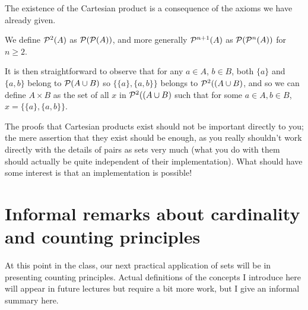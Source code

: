 \documentclass[12pt]{article}
\begin{document}
\begin{description}
The existence of the Cartesian product is a consequence of the axioms we have already given.

We define ${\cal P}^2(A)$ as ${\cal P}({\cal P}(A))$, and more generally ${\cal P}^{n+1}(A)$ as 
${\cal P}({\cal P}^n(A))$ for $n \geq 2$.

It is then straightforward to observe that for any $a \in A$, $b \in B$, both $\{a\}$ and $\{a,b\}$ belong to ${\cal P}(A \cup B)$ so $\{\{a\},\{a,b\}\}$ belongs to ${\cal P}^2((A \cup B)$, and so we can define $A \times B$ as the set of all $x$ in ${\cal P}^2((A \cup B)$ such that for some $a\in A, b\in B$, $x = \{\{a\},\{a,b\}\}$.

The proofs that Cartesian products exist should not be important directly to you;  the mere assertion that they exist should be enough, as you really shouldn't work directly with the details of pairs as sets very much (what you do with them should actually be quite independent of their implementation).  What should have some interest is that an implementation is possible!

\end{description}

\newpage

\section{Informal remarks about cardinality and counting principles}

At this point in the class, our next practical application of sets will be in presenting counting principles.  Actual definitions of the concepts I introduce here will appear in future lectures but require a bit more work, but I give an informal summary here.
\end{document}
